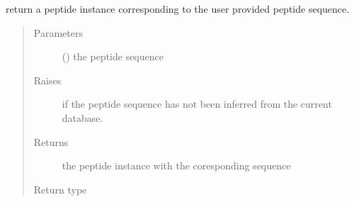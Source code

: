 \documentclass[letterpaper,10pt,english]{sphinxmanual}
\begin{document}
\begin{fulllineitems}
\begin{fulllineitems}
\begin{quote}
\begin{description}
\end{description}\end{quote}

\end{fulllineitems}


\begin{fulllineitems}
\label{\detokenize{IPTK.Classes:IPTK.Classes.Experiment.Experiment.get_peptide}}
return a peptide instance corresponding to the user provided peptide sequence.
\begin{quote}\begin{description}
\item[{Parameters}] \leavevmode
{} () \textendash{} the peptide sequence

\item[{Raises}] \leavevmode
{} \textendash{} if the peptide sequence has not been inferred from the current database.

\item[{Returns}] \leavevmode
the peptide instance with the coresponding sequence

\item[{Return type}] \leavevmode
{\hyperref[\detokenize{IPTK.Classes:IPTK.Classes.Peptide.Peptide}]{}}

\end{description}\end{quote}

\end{fulllineitems}



\end{fulllineitems}
\end{document}
